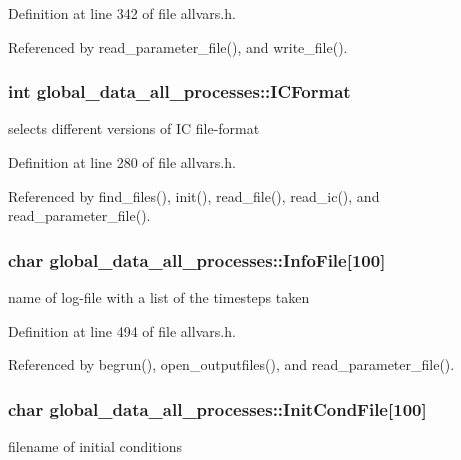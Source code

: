 Definition at line 342 of file allvars.h.



Referenced by read\_\-parameter\_\-file(), and write\_\-file().

\hypertarget{structglobal__data__all__processes_a1c63650e75378a527870ab40f1145df1}{
\subsubsection[{ICFormat}]{\setlength{\rightskip}{0pt plus 5cm}int {\bf global\_\-data\_\-all\_\-processes::ICFormat}}}
\label{structglobal__data__all__processes_a1c63650e75378a527870ab40f1145df1}
selects different versions of IC file-\/format 

Definition at line 280 of file allvars.h.



Referenced by find\_\-files(), init(), read\_\-file(), read\_\-ic(), and read\_\-parameter\_\-file().

\hypertarget{structglobal__data__all__processes_a3cbcdacb8b522288268993f0ce5b15ac}{
\subsubsection[{InfoFile}]{\setlength{\rightskip}{0pt plus 5cm}char {\bf global\_\-data\_\-all\_\-processes::InfoFile}\mbox{[}100\mbox{]}}}
\label{structglobal__data__all__processes_a3cbcdacb8b522288268993f0ce5b15ac}
name of log-\/file with a list of the timesteps taken 

Definition at line 494 of file allvars.h.



Referenced by begrun(), open\_\-outputfiles(), and read\_\-parameter\_\-file().

\hypertarget{structglobal__data__all__processes_adacd2b54a924bb4ce144afc1abbc6138}{
\subsubsection[{InitCondFile}]{\setlength{\rightskip}{0pt plus 5cm}char {\bf global\_\-data\_\-all\_\-processes::InitCondFile}\mbox{[}100\mbox{]}}}
\label{structglobal__data__all__processes_adacd2b54a924bb4ce144afc1abbc6138}
filename of initial conditions 

